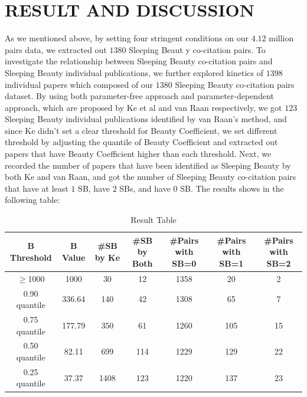 \documentclass[utf8]{frontiersSCNS}
\begin{document}
\section{RESULT AND DISCUSSION}

As we mentioned above, by setting four stringent conditions on our $4.12$ million pairs data, we extracted out $1380$ Sleeping Beaut y co-citation pairs. To investigate the relationship between Sleeping Beauty co-citation pairs and Sleeping Beauty individual publications, we further explored kinetics of $1398$ individual papers which composed of our $1380$ Sleeping Beauty co-citation pairs dataset. By using both parameter-free approach and parameter-dependent approach, which are proposed by Ke et al and van Raan respectively, we got $123$ Sleeping Beauty individual publications identified by van Raan's method, and since Ke didn't set a clear threshold for Beauty Coefficient, we set different threshold by adjusting the quantile of Beauty Coefficient and extracted out papers that have Beauty Coefficient higher than each threshold. Next, we recorded the number of papers that have been identified as Sleeping Beauty by both Ke and van Raan, and got the number of Sleeping Beauty co-citation pairs that have at least $1$ SB, have $2$ SBs, and have $0$ SB. The results shows in the following table:
\begin{table}[ht]
\caption{Result Table} %
\centering %
\begin{center}
\begin{tabular}{c c c c c c c} %
B Threshold & B Value & \#SB by Ke & \#SB by Both & \#Pairs with SB=0 & \#Pairs with SB=1 & \#Pairs with SB=2 \\ [0.5ex] %
\hline %
$\geq$1000 & 1000 & 30 & 12 & 1358 & 20 & 2 \\ %
0.90 quantile & 336.64 &140 & 42 & 1308 & 65 & 7 \\
0.75 quantile & 177.79 & 350 & 61 & 1260 & 105 & 15 \\
0.50 quantile & 82.11 & 699 & 114 & 1229 & 129 & 22 \\
0.25 quantile & 37.37 & 1408 & 123 & 1220 & 137 & 23 \\ [1ex] %
\hline %
\end{tabular}
\end{center}
\label{table:nonlin} %
\end{table}
\end{document}
